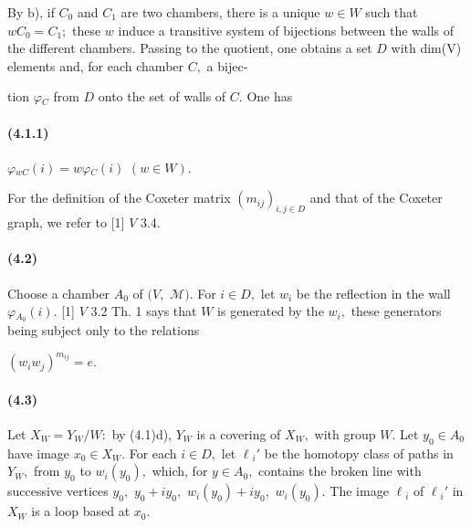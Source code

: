 \documentclass[10pt,a4paper]{article}
\begin{document}
By b), if \ensuremath{C_0} and \ensuremath{C_1} are two chambers, there is a unique \ensuremath{w\in{}W} such that \ensuremath{wC_0=C_1;} these \ensuremath{w} induce a transitive system of bijections between the walls of the different chambers. Passing to the quotient, one obtains a set \ensuremath{D} with dim(V) elements and, for each chamber \ensuremath{C,} a bijec-\par


tion \ensuremath{\varphi{}_C} from \ensuremath{D} onto the set of walls of \ensuremath{C.} One has\par

\paragraph{(4.1.1)} \ensuremath{\varphi{}_{wC}(i)=w\varphi{}_C(i)} \ensuremath{(w\in{}W).}

For the definition of the Coxeter matrix \ensuremath{(m_{ij})_{i,j\in{}D}} and that of the Coxeter graph, we refer to [1] \ensuremath{V} 3.4.\par

\paragraph{(4.2)} Choose a chamber \ensuremath{A_0} of \ensuremath{(V,} \ensuremath{\mathcal{M}).} For \ensuremath{i\in{}D,} let \ensuremath{w_i} be the reflection in the wall \ensuremath{\varphi{}_{A_0}(i).} [1] \ensuremath{V} 3.2 Th. 1 says that \ensuremath{W} is generated by the \ensuremath{w_i,} these generators being subject only to the relations

\ensuremath{(w_iw_j)^{m_{ij}}=e.}\par

\paragraph{(4.3)} Let \ensuremath{X_W=Y_W/W:} by (4.1)d), \ensuremath{Y_W} is a covering of \ensuremath{X_W,} with group \ensuremath{W.} Let \ensuremath{y_0\in{}A_0} have image \ensuremath{x_0\in{}X_W.} For each \ensuremath{i\in{}D,} let \ensuremath{\ell{}_i'} be the homotopy class of paths in \ensuremath{Y_W,} from \ensuremath{y_0} to \ensuremath{w_i(y_0),} which, for \ensuremath{y\in{}A_0,} contains the broken line with successive vertices \ensuremath{y_0,} \ensuremath{y_0+iy_0,} \ensuremath{w_i(y_0)+iy_0,} \ensuremath{w_i(y_0).} The image \ensuremath{\ell{}_i} of \ensuremath{\ell{}_i'} in \ensuremath{X_W} is a loop based at \ensuremath{x_0.}
\end{document}
